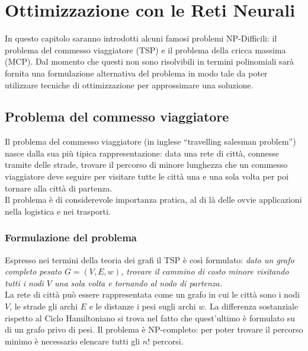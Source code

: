 
\chapter{Ottimizzazione con le Reti Neurali} %
\label{cha:ottimizzazione_con_le_reti_neurali}
In questo capitolo saranno introdotti alcuni famosi problemi NP-Difficili: il problema del commesso viaggiatore (TSP) e il problema della cricca massima (MCP). Dal momento che questi non sono risolvibili in termini polinomiali sarà fornita una formulazione alternativa del problema in modo tale da poter utilizzare tecniche di ottimizzazione per approssimare una soluzione.

\section{Problema del commesso viaggiatore} %
\label{sec:problema_del_commesso_viaggiatore}
Il problema del commesso viaggiatore (in inglese “travelling salesman problem”) nasce dalla sua più tipica rappresentazione: data una rete di città, connesse tramite delle strade, trovare il percorso di minore lunghezza che un commesso viaggiatore deve seguire per visitare tutte le città una e una sola volta per poi tornare alla città di partenza.\\

Il problema è di considerevole importanza pratica, al di là delle ovvie applicazioni nella logistica e nei trasporti.


\subsection{Formulazione del problema} %
\label{sub:formulazione_del_problema}
Espresso nei termini della teoria dei grafi il TSP è così formulato: \emph{dato un grafo completo pesato $G=(V, E, w)$, trovare il cammino di costo minore visitando tutti i nodi $V$ una sola volta e tornando al nodo di partenza.}\\

La rete di città può essere rappresentata come un grafo in cui le città sono i nodi $V$, le strade gli archi $E$ e le distanze i pesi sugli archi $w$. La differenza sostanziale rispetto al Ciclo Hamiltoniano si trova nel fatto che quest'ultimo è formulato su di un grafo privo di pesi. Il problema è NP-completo: per poter trovare il percorso minimo è necessario elencare tutti gli \textbf{$n!$} percorsi.

